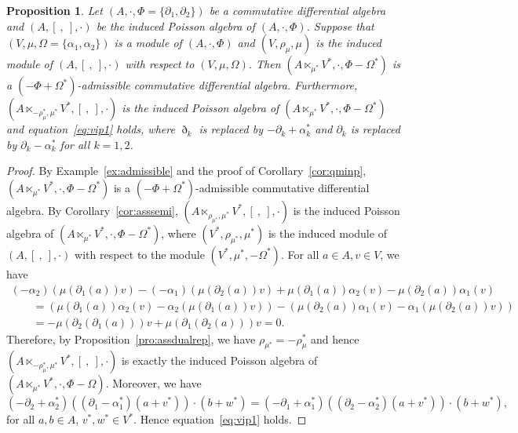 \documentclass[10pt,a4paper]{amsart}
\numberwithin{equation}{section}
\newtheorem{Proposition}[Theorem]{Proposition}
{ \theoremstyle{definition}
	\newtheorem{Definition}[Theorem]{Definition}
	\newtheorem{Note}[Theorem]{Note}
	\newtheorem{Example}[Theorem]{Example}
	\newtheorem{Remark}[Theorem]{Remark} }
\begin{document}
\begin{Proposition}\label{pro:cond}
 Let $(A, \cdot, \Phi = \{\partial_1,\partial_2\})$ be a commutative differential algebra and
 $(A, [\ ,\ ], \cdot)$
 be the induced Poisson algebra of $(A, \cdot, \Phi)$.
 Suppose that $(V, \mu, \Omega = \{\alpha_1, \alpha_2\})$ is a module of $(A, \cdot, \Phi)$ and
 $(V, \rho_\mu, \mu)$ is the induced module of $(A, [\ ,\ ], \cdot)$ with respect to $(V, \mu, \Omega)$.
 Then $(A \ltimes_{\mu^*} V^*, \cdot, \Phi - \Omega^*)$ is a $(-\Phi + \Omega^*)$-admissible commutative differential algebra.
 Furthermore, $(A \ltimes_{-\rho_\mu^*, \mu^*} V^*, [\ ,\ ], \cdot)$ is the induced Poisson algebra of $(A \ltimes_{\mu^*} V^*, \cdot, \Phi - \Omega^*)$
 and equation~\eqref{eq:vip1} holds, where $\eth_k$ is replaced by $-\partial_k + \alpha_k^*$ and $\partial_k$ is replaced by $\partial_k - \alpha_k^*$ for all $k=1, 2$.
\end{Proposition}
\begin{proof}
By Example~\ref{ex:admissible} and the proof of Corollary~\ref{cor:qminp},
$(A \ltimes_{\mu^*} V^*, \cdot, \Phi - \Omega^*)$ is a $(-\Phi + \Omega^*)$-admissible commutative differential algebra.
By Corollary~\ref{cor:asssemi}, $(A \ltimes_{\rho_{\mu^*}, \mu^*} V^*, [\ ,\ ], \cdot)$ is the induced Poisson algebra of $(A \ltimes_{\mu^*} V^*, \cdot,
\Phi - \Omega^*)$,
where $(V^*, \rho_{\mu^*}, \mu^*)$ is the induced module of $(A, [\ ,\ ], \cdot)$ with respect to the module $(V^*, \mu^{*}, -\Omega^*)$.
For all $a \in A, v \in V$, we have
\begin{gather*}
 (-\alpha_2)(\mu(\partial_1(a))v) - (-\alpha_1)(\mu(\partial_2(a))v) + \mu(\partial_1(a))\alpha_2(v) - \mu(\partial_2(a))\alpha_1(v) \\
\qquad{} = (\mu(\partial_1(a))\alpha_2(v) - \alpha_2(\mu(\partial_1(a))v) ) - (\mu(\partial_2(a))\alpha_1(v) - \alpha_1(\mu(\partial_2(a))v) ) \\
 \qquad{} = - \mu(\partial_2(\partial_1(a)))v + \mu(\partial_1(\partial_2(a)))v = 0.
\end{gather*}
Therefore, by Proposition~\ref{pro:assdualrep}, we have
$\rho_{\mu^*} = - \rho_{\mu}^*$
and hence $(A \ltimes_{-\rho_\mu^*, \mu^*} V^*, [\ ,\ ], \cdot)$ is exactly the
induced Poisson algebra of $(A \ltimes_{\mu^*} V^*, \cdot, \Phi - \Omega)$.
Moreover, we have
\begin{equation*}
 (-\partial_2+\alpha_2^*)((\partial_1-\alpha_1^*)(a+v^*)) \cdot (b+w^*) =
 (-\partial_1+\alpha_1^*)((\partial_2-\alpha_2^*)(a+v^*)) \cdot (b+w^*),
\end{equation*}
for all $a, b \in A$, $v^*, w^* \in V^*$. Hence equation~\eqref{eq:vip1} holds.
\end{proof}
\end{document}
